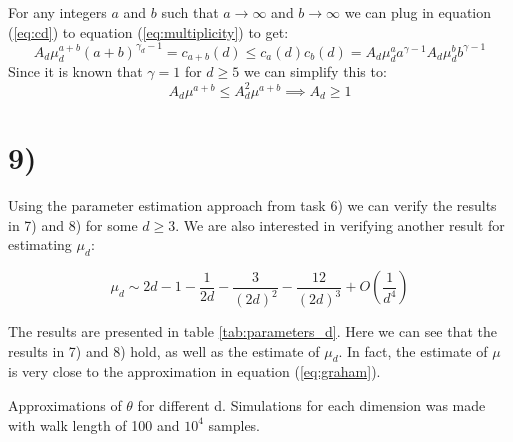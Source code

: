 \documentclass[a4paper]{article}
\begin{document}
For any integers $a$ and $b$ such that $a \to \infty$ and $b \to \infty$ we can plug in equation (\ref{eq:cd}) to equation (\ref{eq:multiplicity}) to get:
\begin{equation}
    A_d\mu_d^{a+b}(a+b)^{\gamma_d-1} = c_{a+b}(d)\leq c_a(d)c_b(d) = A_d\mu_d^aa^{\gamma-1}A_d\mu_d^bb^{\gamma-1}
\end{equation}
Since it is known that $\gamma = 1$ for $d \geq 5$ we can simplify this to:
\begin{equation}
    A_d\mu^{a+b} \leq A_d^2\mu^{a+b} \implies A_d \geq 1
\end{equation}
\section*{9)}

Using the parameter estimation approach from task 6) we can verify the results in 7) and 8) for some $d\geq 3$. We are also interested in verifying another result for estimating $\mu_d$:

\begin{equation}
    \label{eq:graham}
\mu_d \sim 2d-1-\frac{1}{2d} - \frac{3}{(2d)^2} - \frac{12}{(2d)^3} + O(\frac{1}{d^4})
\end{equation}

The results are presented in table \ref{tab:parameters_d}. Here we can see that the results in 7) and 8) hold, as well as the estimate of $\mu_d$. In fact, the estimate of $\mu$ is very close to the approximation in equation (\ref{eq:graham}).

\begin{table}[H]
    \centering
    \caption{Approximations of $\theta$ for different d. Simulations for each dimension was made with walk length of 100 and $10^4$ samples.}
    \label{tab:parameters_d}
    
\end{table}
\end{document}
